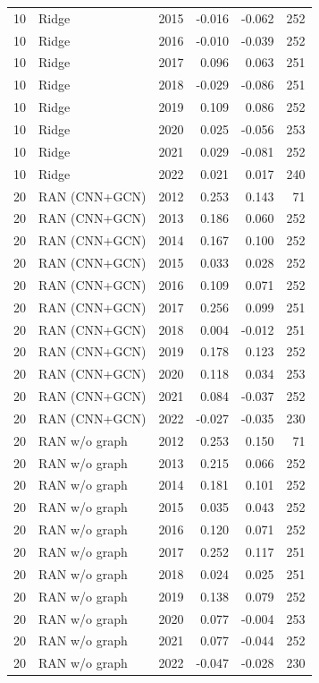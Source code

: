 \begin{table}[htbp]
{\begin{tabular}{llrrrr}
10 & Ridge & 2015 & -0.016 & -0.062 & 252 \\
10 & Ridge & 2016 & -0.010 & -0.039 & 252 \\
10 & Ridge & 2017 & 0.096 & 0.063 & 251 \\
10 & Ridge & 2018 & -0.029 & -0.086 & 251 \\
10 & Ridge & 2019 & 0.109 & 0.086 & 252 \\
10 & Ridge & 2020 & 0.025 & -0.056 & 253 \\
10 & Ridge & 2021 & 0.029 & -0.081 & 252 \\
10 & Ridge & 2022 & 0.021 & 0.017 & 240 \\
20 & RAN (CNN+GCN) & 2012 & 0.253 & 0.143 & 71 \\
20 & RAN (CNN+GCN) & 2013 & 0.186 & 0.060 & 252 \\
20 & RAN (CNN+GCN) & 2014 & 0.167 & 0.100 & 252 \\
20 & RAN (CNN+GCN) & 2015 & 0.033 & 0.028 & 252 \\
20 & RAN (CNN+GCN) & 2016 & 0.109 & 0.071 & 252 \\
20 & RAN (CNN+GCN) & 2017 & 0.256 & 0.099 & 251 \\
20 & RAN (CNN+GCN) & 2018 & 0.004 & -0.012 & 251 \\
20 & RAN (CNN+GCN) & 2019 & 0.178 & 0.123 & 252 \\
20 & RAN (CNN+GCN) & 2020 & 0.118 & 0.034 & 253 \\
20 & RAN (CNN+GCN) & 2021 & 0.084 & -0.037 & 252 \\
20 & RAN (CNN+GCN) & 2022 & -0.027 & -0.035 & 230 \\
20 & RAN w/o graph & 2012 & 0.253 & 0.150 & 71 \\
20 & RAN w/o graph & 2013 & 0.215 & 0.066 & 252 \\
20 & RAN w/o graph & 2014 & 0.181 & 0.101 & 252 \\
20 & RAN w/o graph & 2015 & 0.035 & 0.043 & 252 \\
20 & RAN w/o graph & 2016 & 0.120 & 0.071 & 252 \\
20 & RAN w/o graph & 2017 & 0.252 & 0.117 & 251 \\
20 & RAN w/o graph & 2018 & 0.024 & 0.025 & 251 \\
20 & RAN w/o graph & 2019 & 0.138 & 0.079 & 252 \\
20 & RAN w/o graph & 2020 & 0.077 & -0.004 & 253 \\
20 & RAN w/o graph & 2021 & 0.077 & -0.044 & 252 \\
20 & RAN w/o graph & 2022 & -0.047 & -0.028 & 230 \\

\end{tabular}}
\end{table}
